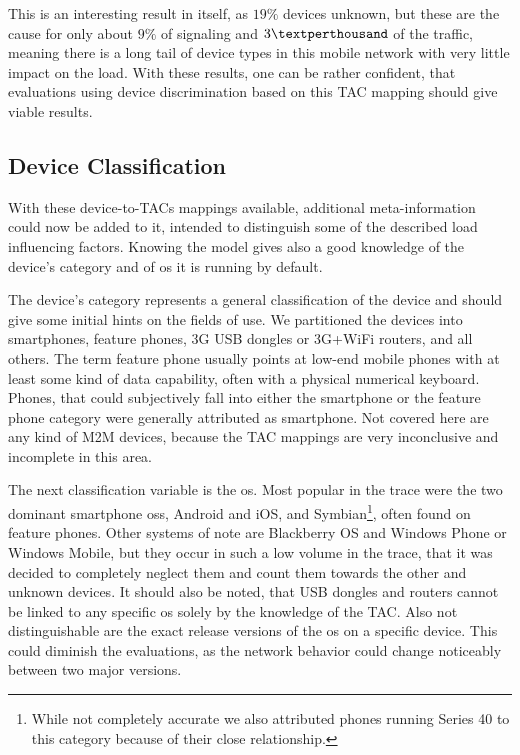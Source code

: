 This is an interesting result in itself, as $19\%$ devices unknown, but these are the cause for only about $9\%$ of signaling and $3\textperthousand$ of the traffic, meaning there is a long tail of device types in this mobile network with very little impact on the load. With these results, one can be rather confident, that evaluations using device discrimination based on this \gls{TAC} mapping should give viable results.


\subsection{Device Classification}

With these device-to-\glspl{TAC} mappings available, additional meta-information could now be added to it, intended to distinguish some of the described load influencing factors. Knowing the model gives also a good knowledge of the device's category and of \gls{os} it is running by default.

The device's category represents a general classification of the device and should give some initial hints on the fields of use. We partitioned the devices into smartphones, feature phones, \gls{3G} USB dongles or \gls{3G}+WiFi routers, and all others. The term feature phone usually points at low-end mobile phones with at least some kind of data capability, often with a physical numerical keyboard. Phones, that could subjectively fall into either the smartphone or the feature phone category were generally attributed as smartphone. Not covered here are any kind of \gls{M2M} devices, because the \gls{TAC} mappings are very inconclusive and incomplete in this area.

The next classification variable is the \gls{os}. Most popular in the trace were the two dominant smartphone \glspl{os}, Android and iOS, and Symbian\footnote{While not completely accurate we also attributed phones running Series 40 to this category because of their close relationship.}, often found on feature phones. Other systems of note are Blackberry OS and Windows Phone or Windows Mobile, but they occur in such a low volume in the trace, that it was decided to completely neglect them and count them towards the other and unknown devices. It should also be noted, that USB dongles and routers cannot be linked to any specific \gls{os} solely by the knowledge of the \gls{TAC}. Also not distinguishable are the exact release versions of the \gls{os} on a specific device. This could diminish the evaluations, as the network behavior could change noticeably between two major versions.

